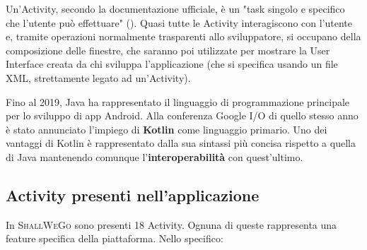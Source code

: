             Un'Activity, secondo la documentazione ufficiale, è un "task singolo e specifico che l'utente può effettuare" (\cite{AndroidDoc}). Quasi tutte le Activity interagiscono con l'utente e, tramite operazioni normalmente trasparenti allo sviluppatore, si occupano della composizione delle finestre, che saranno poi utilizzate per mostrare la User Interface creata da chi sviluppa l'applicazione (che si specifica usando un file XML, strettamente legato ad un'Activity).

            Fino al 2019, Java ha rappresentato il linguaggio di programmazione principale per lo sviluppo di app Android. Alla conferenza Google I/O di quello stesso anno è stato annunciato l'impiego di \textbf{Kotlin} come linguaggio primario. Uno dei vantaggi di Kotlin è rappresentato dalla sua sintassi più concisa rispetto a quella di Java mantenendo comunque l'\textbf{interoperabilità} con quest'ultimo.
        \newpage
        \subsection{Activity presenti nell'applicazione}
            In \textsc{ShallWeGo} sono presenti 18 Activity. Ognuna di queste rappresenta una feature specifica della piattaforma. Nello specifico:

